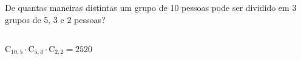 \begin{ex}
 	De quantas maneiras distintas um grupo de 10 pessoas pode ser dividido em 3 grupos de 5, 3  e 2 pessoas?
 	  \begin{sol}
 	  \phantom{A}  \\
 	  $\mathrm{C}_{{10},5}\cdot\mathrm{C}_{5,3}\cdot\mathrm{C}_{2,2}=2520$
 	  \end{sol}
\end{ex}